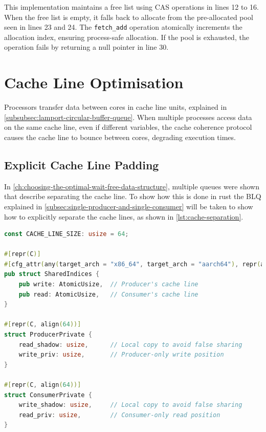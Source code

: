 This implementation maintains a free list using \ac{CAS} operations in lines 12 to 16. When the free list is empty, it falls back to allocate from the pre-allocated pool seen in lines 23 and 24. The \texttt{fetch\_add} operation atomically increments the allocation index, ensuring process-safe allocation. If the pool is exhausted, the operation fails by returning a null pointer in line 30.

\section{Cache Line Optimisation}
Processors transfer data between cores in cache line units, explained in \cref{subsubsec:lamport-circular-buffer-queue}. When multiple processes access data on the same cache line, even if different variables, the cache coherence protocol causes the cache line to bounce between cores, degrading execution times.

\subsection{Explicit Cache Line Padding}

In \cref{ch:choosing-the-optimal-wait-free-data-structure}, multiple queues were shown that describe separating the cache line. To show how this is done in rust the \ac{BLQ} explained in \cref{subsec:single-producer-and-single-consumer} will be taken to show how to explicitly separate the cache lines, as shown in \cref{lst:cache-separation}.

\begin{lstlisting}[language=Rust, style=boxed, caption={Cache line separation in BlqQueue}, label={lst:cache-separation}]
const CACHE_LINE_SIZE: usize = 64;

#[repr(C)]
#[cfg_attr(any(target_arch = "x86_64", target_arch = "aarch64"), repr(align(64)))]
pub struct SharedIndices {
    pub write: AtomicUsize,  // Producer's cache line
    pub read: AtomicUsize,   // Consumer's cache line
}

#[repr(C, align(64))]
struct ProducerPrivate {
    read_shadow: usize,      // Local copy to avoid false sharing
    write_priv: usize,       // Producer-only write position
}

#[repr(C, align(64))]
struct ConsumerPrivate {
    write_shadow: usize,     // Local copy to avoid false sharing
    read_priv: usize,        // Consumer-only read position
}
\end{lstlisting}

